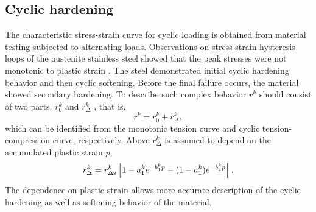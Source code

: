 \documentclass[preprint,5p,twocolumn,11pt,sort&compress]{elsarticle}
\begin{document}
\subsection{Cyclic hardening}
\noindent
The characteristic stress-strain curve for cyclic loading is obtained from material testing subjected to alternating loads. Observations on stress-strain hysteresis loops of the austenite stainless steel showed that the peak stresses were not monotonic to plastic strain \cite{fang2015cyclic}. The steel demonstrated initial cyclic hardening behavior and then cyclic softening. Before the final failure occurs, the material showed secondary hardening. To describe such complex behavior $r^k$ should consist of two parts, $r_0^k$ and $r_{\Delta}^k$  \cite{fang2015cyclic}, that is,
\begin{equation}
\label{Equ:rk1}
{r^k} = r_0^k + r_\Delta ^k,
\end{equation}
which can be identified from the monotonic tension curve and cyclic tension-compression curve, respectively.
Above $r_\Delta ^k$ is assumed to depend on the accumulated plastic strain $p$,
\begin{equation}
\label{Equ:rdeltak1}
r_\Delta ^k = r_{\Delta \rm s}^k\left[ {1 - a_1^k{e^{ - b_1^kp}} - (1-a_1^k){e^{ - b_2^kp}} }\right].
\label{Equ:rdeltak}
\end{equation}
The dependence on plastic strain allows more accurate description of the cyclic hardening as well as softening behavior of the material.
\end{document}
